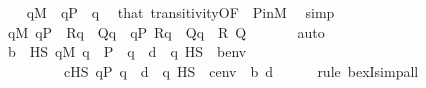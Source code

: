 \begin{isabellebody}
\ \ \isamarkupfalse%
\ {\isachardoublequoteopen}q{\isasymin}M{\isachardoublequoteclose}\ \ {\isachardoublequoteopen}q{\isasymin}P{\isachardoublequoteclose}\ \ q\ \isamarkupfalse%
\ that\ transitivity{\isacharbrackleft}{\kern0pt}OF\ {\isacharunderscore}{\kern0pt}\ P{\isacharunderscore}{\kern0pt}in{\isacharunderscore}{\kern0pt}M{\isacharbrackright}{\kern0pt}\ \isamarkupfalse%
\ simp\isanewline
\ \ \isamarkupfalse%
\isanewline
\ \ \isamarkupfalse%
\ {}{\isacharcolon}{\kern0pt}{\isachardoublequoteopen}{\isasymforall}q{\isasymin}M{\isachardot}{\kern0pt}\ q{\isasymin}P\ {\isasymand}\ R{\isacharparenleft}{\kern0pt}q{\isacharparenright}{\kern0pt}\ {\isasymlongrightarrow}\ Q{\isacharparenleft}{\kern0pt}q{\isacharparenright}{\kern0pt}\ {\isasymLongrightarrow}\ {\isacharparenleft}{\kern0pt}{\isasymforall}q{\isasymin}P{\isachardot}{\kern0pt}\ R{\isacharparenleft}{\kern0pt}q{\isacharparenright}{\kern0pt}\ {\isasymlongrightarrow}\ Q{\isacharparenleft}{\kern0pt}q{\isacharparenright}{\kern0pt}{\isacharparenright}{\kern0pt}{\isachardoublequoteclose}\ \ R\ Q\ \isanewline
\ \ \ \ \isamarkupfalse%
\ auto\isanewline
\ \ \isamarkupfalse%
\isanewline
\ \ \isamarkupfalse%
\ {\isachardoublequoteopen}{\isasymlbrakk}b\ {\isasymin}\ HS{\isacharsemicolon}{\kern0pt}\ {\isasymforall}q{\isasymin}M{\isachardot}{\kern0pt}\ q\ {\isasymin}\ P\ {\isasymand}\ q\ {\isasympreceq}\ d\ {\isasymlongrightarrow}\ {\isasymnot}{\isacharparenleft}{\kern0pt}q\ {\isasymtturnstile}HS\ {\isasymphi}\ {\isacharparenleft}{\kern0pt}{\isacharbrackleft}{\kern0pt}b{\isacharbrackright}{\kern0pt}{\isacharat}{\kern0pt}env{\isacharparenright}{\kern0pt}{\isacharparenright}{\kern0pt}{\isasymrbrakk}\ {\isasymLongrightarrow}\isanewline
\ \ \ \ \ \ \ \ \ {\isasymexists}c{\isasymin}HS{\isachardot}{\kern0pt}\ {\isasymforall}q{\isasymin}P{\isachardot}{\kern0pt}\ q\ {\isasympreceq}\ d\ {\isasymlongrightarrow}\ {\isasymnot}{\isacharparenleft}{\kern0pt}q\ {\isasymtturnstile}HS\ {\isasymphi}\ {\isacharparenleft}{\kern0pt}{\isacharbrackleft}{\kern0pt}c{\isacharbrackright}{\kern0pt}{\isacharat}{\kern0pt}env{\isacharparenright}{\kern0pt}{\isacharparenright}{\kern0pt}{\isachardoublequoteclose}\ \ b\ d\isanewline
\ \ \ \ \isamarkupfalse%
\ {\isacharparenleft}{\kern0pt}rule\ bexI{\isacharcomma}{\kern0pt}simp{\isacharunderscore}{\kern0pt}all{\isacharparenright}{\kern0pt}\isanewline
\ \ \isamarkupfalse%

\end{isabellebody}
